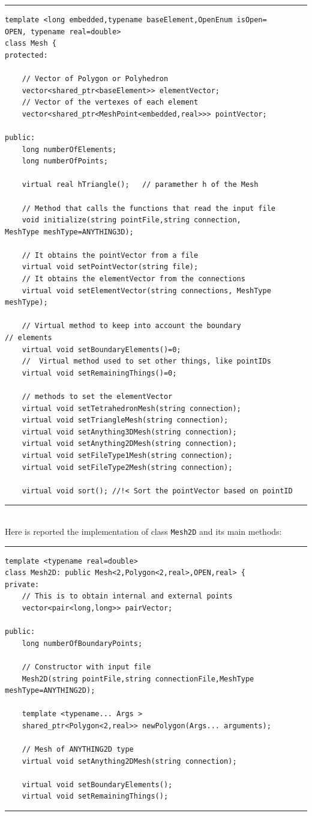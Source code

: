 \noindent\rule{16cm}{1pt}
\begin{lstlisting}[caption=File \texttt{Mesh.h}]
template <long embedded,typename baseElement,OpenEnum isOpen=
OPEN, typename real=double>
class Mesh {
protected:
    
    // Vector of Polygon or Polyhedron
    vector<shared_ptr<baseElement>> elementVector;	
    // Vector of the vertexes of each element
    vector<shared_ptr<MeshPoint<embedded,real>>> pointVector;	
	
public:
    long numberOfElements;
    long numberOfPoints;

    virtual real hTriangle();	// paramether h of the Mesh
	
    // Method that calls the functions that read the input file
    void initialize(string pointFile,string connection,
MeshType meshType=ANYTHING3D);

    // It obtains the pointVector from a file
    virtual void setPointVector(string file);	
    // It obtains the elementVector from the connections
    virtual void setElementVector(string connections, MeshType
meshType);
    
    // Virtual method to keep into account the boundary 
// elements
    virtual void setBoundaryElements()=0;
    //	Virtual method used to set other things, like pointIDs
    virtual void setRemainingThings()=0;

    // methods to set the elementVector
    virtual void setTetrahedronMesh(string connection); 
    virtual void setTriangleMesh(string connection);	
    virtual void setAnything3DMesh(string connection);
    virtual void setAnything2DMesh(string connection);
    virtual void setFileType1Mesh(string connection);
    virtual void setFileType2Mesh(string connection);

    virtual void sort(); //!< Sort the pointVector based on pointID
\end{lstlisting}

\noindent\rule{16cm}{1pt}\\

Here is reported the implementation of class \verb|Mesh2D| and its main methods:

\noindent\rule{16cm}{1pt}
\begin{lstlisting}[caption=File \texttt{Mesh2D.h}]
template <typename real=double>
class Mesh2D: public Mesh<2,Polygon<2,real>,OPEN,real> {
private:
    // This is to obtain internal and external points	
    vector<pair<long,long>> pairVector;

public:
    long numberOfBoundaryPoints;
	
    // Constructor with input file
    Mesh2D(string pointFile,string connectionFile,MeshType 
meshType=ANYTHING2D);

    template <typename... Args >
    shared_ptr<Polygon<2,real>> newPolygon(Args... arguments);

    // Mesh of ANYTHING2D type
    virtual void setAnything2DMesh(string connection);

    virtual void setBoundaryElements();
    virtual void setRemainingThings();
\end{lstlisting}
\noindent\rule{16cm}{1pt}\\


